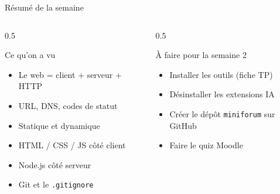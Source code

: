 \documentclass[aspectratio=169,11pt]{beamer}
\begin{document}
\begin{frame}{Résumé de la semaine}
  \begin{columns}[T]
    \begin{column}{0.5\textwidth}
      \begin{block}{Ce qu'on a vu}
        \begin{itemize}
          \item Le web = client + serveur + HTTP
          \item URL, DNS, codes de statut
          \item Statique et dynamique
          \item HTML / CSS / JS côté client
          \item Node.js côté serveur
          \item Git et le \texttt{.gitignore}
        \end{itemize}
      \end{block}
    \end{column}
    \begin{column}{0.5\textwidth}
      \begin{alertblock}{À faire pour la semaine 2}
        \begin{itemize}
          \item Installer les outils (fiche TP)
          \item Désinstaller les extensions IA
          \item Créer le dépôt \texttt{miniforum} sur GitHub
          \item Faire le quiz Moodle
        \end{itemize}
      \end{alertblock}
    \end{column}
  \end{columns}
\end{frame}

{
\begin{frame}[plain]
\end{frame}
}
\end{document}
